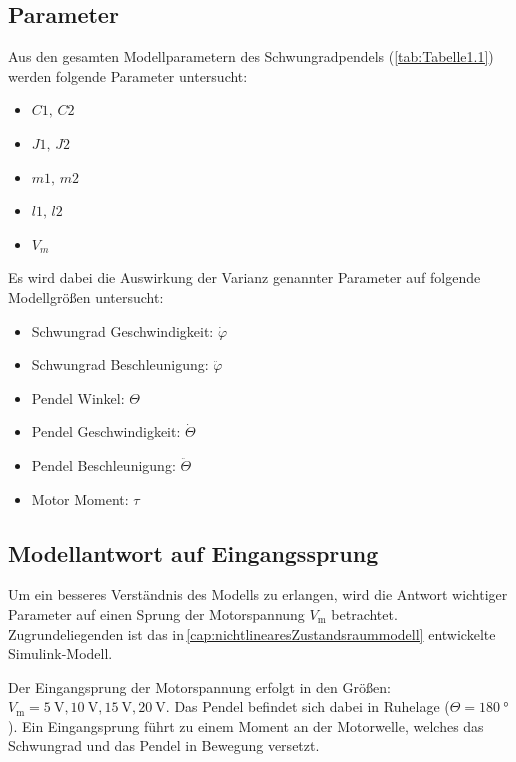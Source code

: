 \subsection{Parameter}
Aus den gesamten Modellparametern des Schwungradpendels (\ref{tab:Tabelle1.1}) werden folgende Parameter untersucht:
\begin{itemize}
    \item $C1,\, C2$
    \item $J1,\, J2$
    \item $m1,\, m2$
    \item $l1,\, l2$
    \item $V_m$
\end{itemize}
Es wird dabei die Auswirkung der Varianz genannter Parameter auf folgende Modellgrößen untersucht:
\begin{itemize}
    \item Schwungrad Geschwindigkeit: $\dot\varphi$
    \item Schwungrad Beschleunigung: $\ddot\varphi$
    \item Pendel Winkel: $\Theta$
    \item Pendel Geschwindigkeit: $\dot\Theta$
    \item Pendel Beschleunigung: $\ddot\Theta$
    \item Motor Moment: $\tau$
\end{itemize}


\subsection*{Modellantwort auf Eingangssprung}

Um ein besseres Verständnis des Modells zu erlangen, wird die Antwort wichtiger Parameter auf einen Sprung der Motorspannung $V_{\mathrm{m}}$ betrachtet.
Zugrundeliegenden ist das in\,\ref{cap:nichtlinearesZustandsraummodell} entwickelte Simulink-Modell.

Der Eingangsprung der Motorspannung erfolgt in den Größen: $V_{\mathrm{m}}=\SI{5}{\volt},\SI{10}{\volt},\SI{15}{\volt},\SI{20}{\volt}$.
Das Pendel befindet sich dabei in Ruhelage ($\Theta=\SI{180}{\degree}$). 
Ein Eingangsprung führt zu einem Moment an der Motorwelle, welches das Schwungrad und das Pendel in Bewegung versetzt.\\

